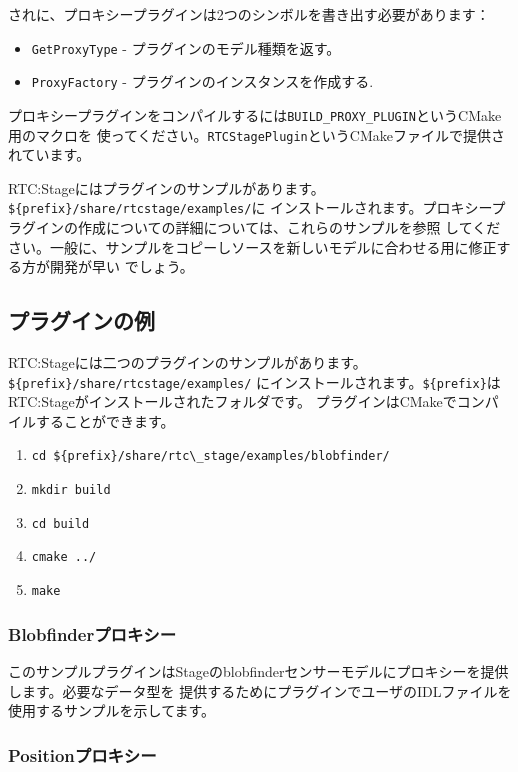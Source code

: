 \documentclass[a4paper,10pt]{article}
\newenvironment{Japanese}{%
  \CJKfamily{min}%
  \CJKtilde
  \CJKnospace}{}
\begin{document}
\begin{CJK}{UTF8}{}
\begin{Japanese}
されに、プロキシープラグインは2つのシンボルを書き出す必要があります：
\begin{itemize}
  \item \verb|GetProxyType| - プラグインのモデル種類を返す。
  \item \verb|ProxyFactory| - プラグインのインスタンスを作成する.
\end{itemize}

プロキシープラグインをコンパイルするには\verb|BUILD_PROXY_PLUGIN|というCMake用のマクロを
使ってください。\verb|RTCStagePlugin|というCMakeファイルで提供されています。

RTC:Stageにはプラグインのサンプルがあります。\verb|${prefix}/share/rtcstage/examples/|に
インストールされます。プロキシープラグインの作成についての詳細については、これらのサンプルを参照
してください。一般に、サンプルをコピーしソースを新しいモデルに合わせる用に修正する方が開発が早い
でしょう。

\subsection{プラグインの例}
\label{sec1:example-plugins}

RTC:Stageには二つのプラグインのサンプルがあります。\verb|${prefix}/share/rtcstage/examples/|
にインストールされます。\verb|${prefix}|はRTC:Stageがインストールされたフォルダです。
プラグインはCMakeでコンパイルすることができます。

\begin{enumerate}
  \item \verb|cd ${prefix}/share/rtc\_stage/examples/blobfinder/|
  \item \verb|mkdir build|
  \item \verb|cd build|
  \item \verb|cmake ../|
  \item \verb|make|
\end{enumerate}

\subsubsection{Blobfinderプロキシー}
\label{sec2:blobfinder-proxy}

このサンプルプラグインはStageのblobfinderセンサーモデルにプロキシーを提供します。必要なデータ型を
提供するためにプラグインでユーザのIDLファイルを使用するサンプルを示してます。

\subsubsection{Positionプロキシー}
\label{sec2:position-proxy}


\end{Japanese}
\end{CJK}
\end{document}
